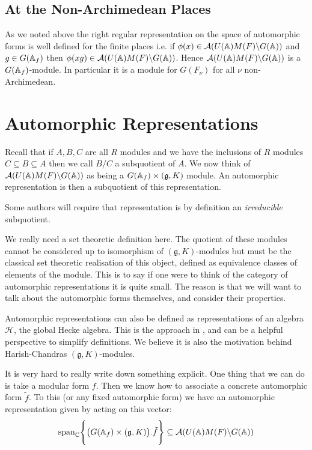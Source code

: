 \subsection{At the Non-Archimedean Places}
As we noted above the right regular representation on the space of automorphic forms is well defined for the finite places i.e. 
if \(\phi(x)\in \mathcal{A}(U(\A)M(F)\backslash G(\A))\) and \(g\in G(\A_f)\) then \(\phi(xg) \in \mathcal{A}(U(\A)M(F)\backslash G(\A)) \). Hence \(\mathcal{A}(U(\A)M(F)\backslash G(\A))\) is a \(G(\A_f)\)-module. In particular it is a module for \(G(F_\nu)\) for all \(\nu\) non-Archimedean.

\section{Automorphic Representations}
Recall that if \(A, B, C\) are all \(R\) modules and we have the inclusions of \(R\) modules \(C \subseteq B \subseteq A\) then we call \(B/C\) a subquotient of \(A\). We now think of \(\mathcal{A}(U(\A)M(F)\backslash G(\A))\) as being a \(G(\A_f)\times (\mathfrak{g}, K)\) module. An automorphic representation is then a subquotient of this representation.
\begin{remark}
    Some authors will require that representation is by definition an \textit{irreducible} subquotient.
\end{remark}
\begin{remark}
    We really need a set theoretic definition here. The quotient of these modules cannot be considered up to isomorphism of \((\mathfrak{g}, K)\)-modules but must be the classical set theoretic realisation of this object, defined as equivalence classes of elements of the module. This is to say if one were to think of the category of automorphic representations it is quite small. The reason is that we will want to talk about the automorphic forms themselves, and consider their properties.
\end{remark}

\begin{remark}
    Automorphic representations can also be defined as representations of an algebra \(\mathcal{H}\), the global Hecke algebra. This is the approach in \cite[I.II(4.6)]{borelAutomorphicFormsRepresentations1979}, and can be a helpful perspective to simplify definitions. We believe it is also the motivation behind Harish-Chandras \((\mathfrak{g}, K)\)-modules. 
\end{remark}

\begin{example}
    It is very hard to really write down something explicit. One thing that we can do is take a modular form \(f\). Then we know how to associate a concrete automorphic form \(\tilde{f}\). To this (or any fixed automorphic form) we have an automorphic representation given by acting on this vector:
    \[\mathrm{span}_\C \Biggl\{\big(G(\A_f)\times (\mathfrak{g}, K)\big).\tilde{f}\Biggr\} \subseteq \mathcal{A}(U(\A)M(F)\backslash G(\A))\]
\end{example}

